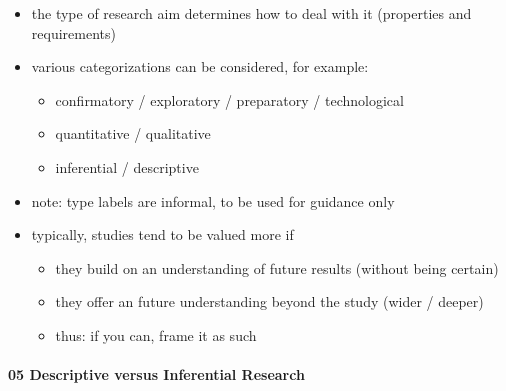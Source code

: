 \documentclass[
]{article}
\providecommand{\tightlist}{%
  \setlength{\itemsep}{0pt}\setlength{\parskip}{0pt}}
\begin{document}
\begin{itemize}
\tightlist
\item
  the type of research aim determines how to deal with it (properties
  and requirements)
\item
  various categorizations can be considered, for example:

  \begin{itemize}
  \tightlist
  \item
    confirmatory / exploratory / preparatory / technological
  \item
    quantitative / qualitative
  \item
    inferential / descriptive \\
  \end{itemize}
\item
  note: type labels are informal, to be used for guidance only
\item
  typically, studies tend to be valued more if

  \begin{itemize}
  \tightlist
  \item
    they build on an understanding of future results (without being
    certain)
  \item
    they offer an future understanding beyond the study (wider / deeper)
  \item
    thus: if you can, frame it as such
  \end{itemize}
\end{itemize}

\hypertarget{descriptive-versus-inferential-research}{%
\paragraph{05 Descriptive versus Inferential
Research}\label{descriptive-versus-inferential-research}}
\end{document}
